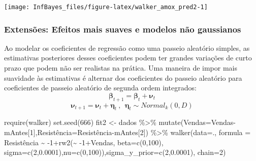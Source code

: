 \documentclass[
]{book}
\newenvironment{Shaded}{\begin{snugshade}}{\end{snugshade}}
\newcommand{\AttributeTok}[1]{\textcolor[rgb]{0.77,0.63,0.00}{#1}}
\newcommand{\DecValTok}[1]{\textcolor[rgb]{0.00,0.00,0.81}{#1}}
\newcommand{\FloatTok}[1]{\textcolor[rgb]{0.00,0.00,0.81}{#1}}
\newcommand{\FunctionTok}[1]{\textcolor[rgb]{0.00,0.00,0.00}{#1}}
\newcommand{\NormalTok}[1]{#1}
\newcommand{\OtherTok}[1]{\textcolor[rgb]{0.56,0.35,0.01}{#1}}
\newcommand{\SpecialCharTok}[1]{\textcolor[rgb]{0.00,0.00,0.00}{#1}}
\begin{document}
\begin{center}\texttt{[image: InfBayes\_files/figure-latex/walker\_amox\_pred2-1]} \end{center}

\hypertarget{extensuxf5es-efeitos-mais-suaves-e-modelos-nuxe3o-gaussianos}{%
\subsubsection{Extensões: Efeitos mais suaves e modelos não gaussianos}\label{extensuxf5es-efeitos-mais-suaves-e-modelos-nuxe3o-gaussianos}}

Ao modelar os coeficientes de regressão como uma passeio aleatório simples, as estimativas posteriores desses coeficientes podem ter grandes variações de curto prazo que podem não ser realistas na prática. Uma maneira de impor mais suavidade às estimativas é alternar dos coeficientes do passeio aleatório para coeficientes de passeio aleatório de segunda ordem integrados:
\[\boldsymbol\beta_{t+1} = \boldsymbol\beta_t + \boldsymbol\nu_t\]
\[\boldsymbol\nu_{t+1} = \boldsymbol\nu_t + \boldsymbol\eta_t ~,~~ \boldsymbol\eta_t \sim \textit{Normal}_k(0,D)\]

\begin{Shaded}
\begin{Highlighting}[]
\FunctionTok{require}\NormalTok{(walker)}
\FunctionTok{set.seed}\NormalTok{(}\DecValTok{666}\NormalTok{)}
\NormalTok{fit2 }\OtherTok{\textless{}{-}}\NormalTok{ dados }\SpecialCharTok{\%\textgreater{}\%} 
  \FunctionTok{mutate}\NormalTok{(}\AttributeTok{Vendas=}\NormalTok{Vendas}\SpecialCharTok{{-}}\NormalTok{mAntes[}\DecValTok{1}\NormalTok{],Resistência}\OtherTok{=}\NormalTok{Resistência}\SpecialCharTok{{-}}\NormalTok{mAntes[}\DecValTok{2}\NormalTok{]) }\SpecialCharTok{\%\textgreater{}\%}
  \FunctionTok{walker}\NormalTok{(}\AttributeTok{data=}\NormalTok{., }\AttributeTok{formula =}\NormalTok{ Resistência }\SpecialCharTok{\textasciitilde{}} \SpecialCharTok{{-}}\DecValTok{1}\SpecialCharTok{+}\FunctionTok{rw2}\NormalTok{(}\SpecialCharTok{\textasciitilde{}} \SpecialCharTok{{-}}\DecValTok{1}\SpecialCharTok{+}\NormalTok{Vendas, }\AttributeTok{beta=}\FunctionTok{c}\NormalTok{(}\DecValTok{0}\NormalTok{,}\DecValTok{100}\NormalTok{),}
        \AttributeTok{sigma=}\FunctionTok{c}\NormalTok{(}\DecValTok{2}\NormalTok{,}\FloatTok{0.0001}\NormalTok{),}\AttributeTok{nu=}\FunctionTok{c}\NormalTok{(}\DecValTok{0}\NormalTok{,}\DecValTok{100}\NormalTok{)),}\AttributeTok{sigma\_y\_prior=}\FunctionTok{c}\NormalTok{(}\DecValTok{2}\NormalTok{,}\FloatTok{0.0001}\NormalTok{), }\AttributeTok{chain=}\DecValTok{2}\NormalTok{)}
\end{Highlighting}
\end{Shaded}
\end{document}
